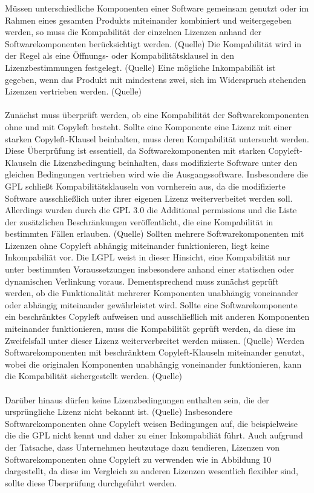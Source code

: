 Müssen unterschiedliche Komponenten einer Software gemeinsam genutzt oder im Rahmen eines gesamten Produkts miteinander kombiniert und weitergegeben werden, so muss die Kompabilität der einzelnen Lizenzen anhand der Softwarekomponenten berücksichtigt werden. (Quelle) Die Kompabilität wird in der Regel als eine Öffnungs- oder Kompabilitätsklausel in den Lizenzbestimmungen festgelegt. (Quelle) Eine mögliche Inkompabiliät ist gegeben, wenn das Produkt mit mindestens zwei, sich im Widerspruch stehenden Lizenzen vertrieben werden. (Quelle)\\\\ Zunächst muss überprüft werden, ob eine Kompabilität der Softwarekomponenten ohne und mit Copyleft besteht. Sollte eine Komponente eine Lizenz mit einer starken Copyleft-Klausel beinhalten, muss deren Kompabilität untersucht werden. Diese Überprüfung ist essentiell, da Softwarekomponenten mit starken Copyleft-Klauseln die Lizenzbedingung beinhalten, dass modifizierte Software unter den gleichen Bedingungen vertrieben wird wie die Ausgangssoftware. Insbesondere die GPL schließt Kompabilitätsklauseln von vornherein aus, da die modifizierte Software ausschließlich unter ihrer eigenen Lizenz weiterverbeitet werden soll. Allerdings wurden durch die GPL 3.0 die Additional permissions und die Liste der zusätzlichen Beschränkungen veröffentlicht, die eine Kompabilität in bestimmten Fällen erlauben. (Quelle) Sollten mehrere Softwarekomponenten mit Lizenzen ohne Copyleft abhängig miteinander funktionieren, liegt keine Inkompabiliät vor. Die LGPL weist in dieser Hinsicht, eine Kompabilität nur unter bestimmten Voraussetzungen insbesondere anhand einer statischen oder dynamischen Verlinkung voraus. Dementsprechend muss zunächst geprüft werden, ob die Funktionalität mehrerer Komponenten unabhängig voneinander oder abhängig miteinander gewährleistet wird. Sollte eine Softwarekomponente ein beschränktes Copyleft aufweisen und ausschließlich mit anderen Komponenten miteinander funktionieren, muss die Kompabilität geprüft werden, da diese im Zweifelsfall unter dieser Lizenz weiterverbreitet werden müssen. (Quelle) Werden Softwarekomponenten mit beschränktem Copyleft-Klauseln miteinander genutzt, wobei die originalen Komponenten unabhängig voneinander funktionieren, kann die Kompabilität sichergestellt werden. (Quelle) \\\\ Darüber hinaus dürfen keine Lizenzbedingungen enthalten sein, die der ursprüngliche Lizenz nicht bekannt ist. (Quelle) Insbesondere Softwarekomponenten ohne Copyleft weisen Bedingungen auf, die beispielweise die die GPL nicht kennt und daher zu einer Inkompabiliät führt. Auch aufgrund der Tatsache, dass Unternehmen heutzutage dazu tendieren, Lizenzen von Softwarekomponenten ohne Copyleft zu verwenden wie in Abbildung 10 dargestellt, da diese im Vergleich zu anderen Lizenzen wesentlich flexibler sind, sollte diese Überprüfung durchgeführt werden. 

